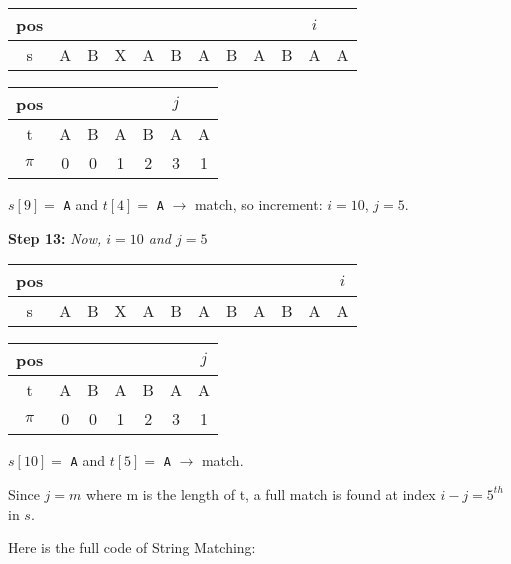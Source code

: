 \begin{table}[H]
\centering
\begin{tabular}{|c|c|c|c|c|c|c|c|c|c|c|c|}
\hline
pos   &   &   &   &   &   &   &   &   &   &$i$&   \\ \hline
s     & A & B & X & A & B & A & B & A & B & A & A \\ \hline
\end{tabular}
\end{table}

\begin{table}[H]
\centering
\begin{tabular}{|c|c|c|c|c|c|c|}
\hline
pos   &   &   &   &   &$j$&   \\ \hline
t     & A & B & A & B & A & A \\ \hline
$\pi$ & 0 & 0 & 1 & 2 & 3 & 1 \\ \hline
\end{tabular}
\end{table}

$s[9] = $ \texttt{A} and $t[4] = $ \texttt{A} $\longrightarrow$ match, so increment: $i = 10$, $j = 5$.

\textbf{Step 13: }\textit{Now, $i = 10$ and $j = 5$}

\begin{table}[H]
\centering
\begin{tabular}{|c|c|c|c|c|c|c|c|c|c|c|c|}
\hline
pos   &   &   &   &   &   &   &   &   &   &   &$i$\\ \hline
s     & A & B & X & A & B & A & B & A & B & A & A \\ \hline
\end{tabular}
\end{table}

\begin{table}[H]
\centering
\begin{tabular}{|c|c|c|c|c|c|c|}
\hline
pos   &   &   &   &   &   &$j$\\ \hline
t     & A & B & A & B & A & A \\ \hline
$\pi$ & 0 & 0 & 1 & 2 & 3 & 1 \\ \hline
\end{tabular}
\end{table}

$s[10] = $ \texttt{A} and $t[5] = $ \texttt{A} $\longrightarrow$ match.

Since $j = m$ where m is the length of t, a full match is found at index $i - j = 5^{th}$ in $s$.

Here is the full code of String Matching:


